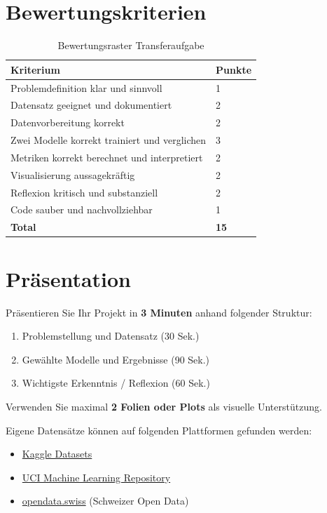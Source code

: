 \section{Bewertungskriterien}

\begin{table}[H]
\centering
\small
\begin{tabular}{p{5.5cm}p{1.5cm}}
\toprule
\textbf{Kriterium} & \textbf{Punkte} \\
\midrule
Problemdefinition klar und sinnvoll & 1 \\
Datensatz geeignet und dokumentiert & 2 \\
Datenvorbereitung korrekt & 2 \\
Zwei Modelle korrekt trainiert und verglichen & 3 \\
Metriken korrekt berechnet und interpretiert & 2 \\
Visualisierung aussagekräftig & 2 \\
Reflexion kritisch und substanziell & 2 \\
Code sauber und nachvollziehbar & 1 \\
\midrule
\textbf{Total} & \textbf{15} \\
\bottomrule
\end{tabular}
\caption{Bewertungsraster Transferaufgabe}
\label{tab:bewertung-transfer-15}
\end{table}

\section{Präsentation}

\begin{myexercise}
Präsentieren Sie Ihr Projekt in \textbf{3 Minuten} anhand folgender Struktur:
\begin{enumerate}
    \item Problemstellung und Datensatz (30 Sek.)
    \item Gewählte Modelle und Ergebnisse (90 Sek.)
    \item Wichtigste Erkenntnis / Reflexion (60 Sek.)
\end{enumerate}
Verwenden Sie maximal \textbf{2 Folien oder Plots} als visuelle Unterstützung.
\end{myexercise}

\begin{myremark}
    Eigene Datensätze können auf folgenden Plattformen gefunden werden:
\begin{itemize}
    \item \href{https://www.kaggle.com/datasets}{Kaggle Datasets}
    \item \href{https://archive.ics.uci.edu/}{UCI Machine Learning Repository}
    \item \href{https://opendata.swiss/de}{opendata.swiss} (Schweizer Open Data)
\end{itemize}
\end{myremark}
